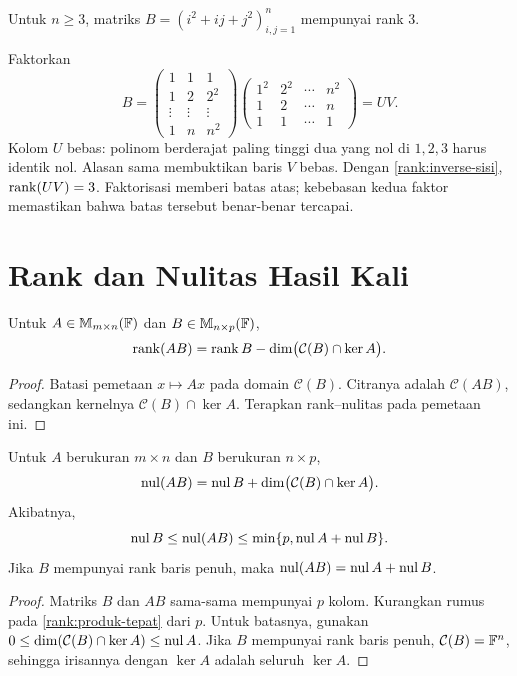 \begin{exam}
    Untuk $n\ge3$, matriks $B=(i^2+ij+j^2)_{i,j=1}^n$ mempunyai rank $3$.
\end{exam}
\begin{solution}
    Faktorkan
    \[
        B=\begin{pmatrix}
            1&1&1\\1&2&2^2\\\vdots&\vdots&\vdots\\1&n&n^2
        \end{pmatrix}
        \begin{pmatrix}
            1^2&2^2&\cdots&n^2\\1&2&\cdots&n\\1&1&\cdots&1
        \end{pmatrix}=UV.
    \]
    Kolom $U$ bebas: polinom berderajat paling tinggi dua yang nol di
    $1,2,3$ harus identik nol. Alasan sama membuktikan baris $V$ bebas.
    Dengan \autoref{rank:inverse-sisi}, $\operatorname{rank}(UV)=3$.
    Faktorisasi memberi batas atas; kebebasan kedua faktor memastikan
    bahwa batas tersebut benar-benar tercapai.
\end{solution}

\section{Rank dan Nulitas Hasil Kali}
\label{rank:produk}

\begin{teorema}
    Untuk $A\in\mathbb{M}_{m\times n}(\mathbb{F})$ dan $B\in\mathbb{M}_{n\times p}(\mathbb{F})$,
    \[
        \operatorname{rank}(AB)=\operatorname{rank} B-\dim\bigl(\mathcal C(B)\cap\ker A\bigr).
    \]
\end{teorema}
\begin{proof}
    Batasi pemetaan $x\mapsto Ax$ pada domain $\mathcal C(B)$.
    Citranya adalah $\mathcal C(AB)$, sedangkan kernelnya
    $\mathcal C(B)\cap\ker A$. Terapkan rank--nulitas pada pemetaan ini.
\end{proof}

\begin{prop}
    \label{rank:nulitas-produk}
    Untuk $A$ berukuran $m\times n$ dan $B$ berukuran $n\times p$,
    \[
        \operatorname{nul}(AB)=\operatorname{nul} B+\dim\bigl(\mathcal C(B)\cap\ker A\bigr).
    \]
    Akibatnya,
    \[
        \operatorname{nul} B\le\operatorname{nul}(AB)\le\min\{p,\operatorname{nul} A+\operatorname{nul} B\}.
    \]
    Jika $B$ mempunyai rank baris penuh, maka
    $\operatorname{nul}(AB)=\operatorname{nul} A+\operatorname{nul} B$.
\end{prop}
\begin{proof}
    Matriks $B$ dan $AB$ sama-sama mempunyai $p$ kolom.
    Kurangkan rumus pada \autoref{rank:produk-tepat} dari $p$.
    Untuk batasnya, gunakan
    $0\le\dim(\mathcal C(B)\cap\ker A)\le\operatorname{nul} A$.
    Jika $B$ mempunyai rank baris penuh, $\mathcal C(B)=\mathbb{F}^n$,
    sehingga irisannya dengan $\ker A$ adalah seluruh $\ker A$.
\end{proof}

